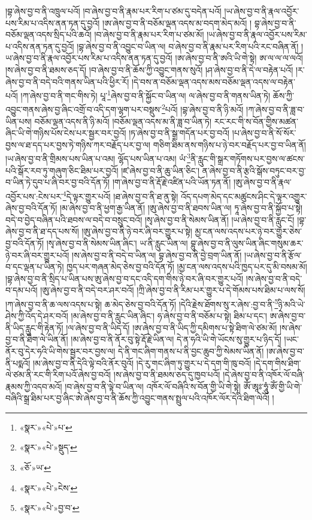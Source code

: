 །བྷ་ཞེས་བྱ་བ་ནི་འཁྲུལ་པའོ། །བ་ཞེས་བྱ་བ་ནི་རྣམ་པར་རིག་པ་ཙམ་དུ་བདེན་པའོ། །ཡ་ཞེས་བྱ་བ་ནི་རྣལ་འབྱོར་པས་རིམ་པ་འདིས་ནན་ཏན་དུ་བྱའོ། །ཨ་ཞེས་བྱ་བ་ནི་བཅོམ་ལྡན་འདས་མ་བདག་མེད་མའོ། །
བྷ་ཞེས་བྱ་བ་ནི་བཅོམ་ལྡན་འདས་སྲིད་པའི་ཆའོ། །བ་ཞེས་བྱ་བ་ནི་རྣམ་པར་རིག་པ་ཙམ་མོ། །ཡ་ཞེས་བྱ་བ་ནི་རྣལ་འབྱོར་པས་རིམ་པ་འདིས་ནན་ཏན་དུ་བྱའོ། །བྷ་ཞེས་བྱ་བ་ནི་འབྱུང་བ་ཡིན་ལ། བ་ཞེས་བྱ་བ་ནི་རྣམ་པར་རིག་པའི་རང་བཞིན་ནོ། །ཡ་ཞེས་བྱ་བ་ནི་རྣལ་འབྱོར་པས་རིམ་པ་འདིས་ནན་ཏན་དུ་བྱའོ། །ཨ་ཞེས་བྱ་བ་ནི་ཨའི་ཡི་གེ་སྟེ། ཨ་ལ་ལ་ལ་ལའོ། །ས་ཞེས་བྱ་བ་ནི་ཐམས་ཅད་དོ། །བ་ཞེས་བྱ་བ་ནི་ཆོས་ཀྱི་འབྱུང་གནས་སུའོ། །ཤ་ཞེས་བྱ་བ་ནི་དེ་ལ་བརྟེན་པའོ། །ར་ཞེས་བྱ་བ་ནི་བདེ་བའི་གནས་ཡིན་པའི་ཕྱིར་རོ། །དེ་བས་ན་བཅོམ་ལྡན་འདས་མས་བཅོམ་ལྡན་འདས་ལ་བརྟེན་པའོ། །ཀ་ཞེས་བྱ་བ་ནི་གང་གིས་ཏེ། པཱ་\footnote{«སྣར་»«པེ་»པ་}ཞེས་བྱ་བ་ནི་སྐྱོང་བ་ཡིན་ལ། ལ་ཞེས་བྱ་བ་ནི་གནས་ཡིན་ཏེ། ཆོས་ཀྱི་འབྱུང་གནས་ཞེས་བྱ་ཞིང་འགྲོ་བ་འདི་དག་ལྷག་པར་བསྡུས་\footnote{«སྣར་»«པེ་»སྡུད་}པའོ། །བྷ་ཞེས་བྱ་བ་ནི་ཉི་མའོ། །ཀ་ཞེས་བྱ་བ་ནི་ཟླ་བ་ཡིན་པས། བཅོམ་ལྡན་འདས་ནི་ཉི་མའོ། །བཅོམ་ལྡན་འདས་མ་ནི་ཟླ་བ་ཡིན་ཏེ། རང་རང་གི་ས་བོན་གྱིས་མཚན་ཞིང་ཡི་གེ་གཉིས་པོས་ངེས་པར་སྦྱར་བར་བྱའོ། །ཏ་ཞེས་བྱ་བ་ནི་སྒྲ་གདོན་པར་བྱ་བའོ། །པ་ཞེས་བྱ་བ་ནི་སོ་སོར་བྱས་ལ་ཐ་དད་པར་བྱས་ཏེ་གཉིས་ཀར་བརྗོད་པར་བྱ་ལ། གཅིག་ཐིམ་ནས་གཉིས་པ་ཉེ་བར་བརྗོད་པར་བྱ་བ་ཡིན་ནོ། །ཡ་ཞེས་བྱ་བ་ནི་གྲིམས་པས་ཡིན་པ་འམ། ལྷོད་པས་ཡིན་པ་འམ། ཡཾ་\footnote{«ཅོ་»ཡ་}ནི་རླུང་གི་སྒྲར་གཏོགས་པར་བྱས་ལ་ཚངས་པའི་སྒོར་རབ་ཏུ་གཞུག་ཅིང་ཐིམ་པར་བྱའོ། །ཛ་ཞེས་བྱ་བ་ནི་ཆུ་ཡིན་ཅིང་། ན་ཞེས་བྱ་བ་ནི་རྩའི་སྒོས་བཏུང་བར་བྱ་བ་ཡིན་ཏེ་དུབ་པ་ཞི་བར་བྱ་བའི་དོན་ཏོ། །ག་ཞེས་བྱ་བ་ནི་རྡོ་རྗེ་འཛིན་པའི་ཡོན་ཏན་ནོ། །ཨུ་ཞེས་བྱ་བ་ནི་རྣལ་འབྱོར་པས་:ངེས་པར་\footnote{«སྣར་»«པེ་»ངེས་}དེ་ལྟར་གྱུར་པའོ། །ཐ་ཞེས་བྱ་བ་ནི་ཐ་ནུ་སྟེ། འོད་དཔག་མེད་དང་མཚུངས་ཤིང་དེ་ལྟར་འགྱུར་ཞེས་བྱ་བའི་དོན་ཏོ། །མ་ཞེས་བྱ་བ་ནི་ཕྱག་རྒྱ་ཡིན་ནོ། །ཨུ་ཞེས་བྱ་བ་ནི་ཐབས་ཡིན་ལ། ཏཱ་ཞེས་བྱ་བ་ནི་སྐྱོབ་པ་སྟེ། བདེ་བ་བྱེད་བཞིན་པའི་ཐབས་ལ་བདེ་བ་བསྲུང་བའོ། །སྭ་ཞེས་བྱ་བ་ནི་སེམས་ཡིན་ནོ། །ཡ་ཞེས་བྱ་བ་ནི་རླུང་ངོ། །བྷ་ཞེས་བྱ་བ་ནི་ཐ་དད་པས་སོ། །ཨུ་ཞེས་བྱ་བ་ནི་ཉེ་བར་ཞི་བར་གྱུར་པ་སྟེ། མྱ་ངན་ལས་འདས་པར་ཉེ་བར་གྱུར་ཅེས་བྱ་བའི་དོན་ཏོ། །སྭ་ཞེས་བྱ་བ་ནི་སེམས་ཡིན་ཞིང་། ཡ་ནི་རླུང་ཡིན་ལ། བྷུ་ཞེས་བྱ་བ་ནི་ལུས་ཡིན་ཞིང་གསུམ་ཆར་ཉེ་བར་ཞི་བར་གྱུར་པའོ། །ས་ཞེས་བྱ་བ་ནི་བདེ་བ་ཡིན་ལ། བྷ་ཞེས་བྱ་བ་ནི་བྱེ་བྲག་ཡིན་ནོ། །ཡ་ཞེས་བྱ་བ་ནི་རྩོལ་བ་དང་ལྡན་པ་ཡིན་ཏེ། ཁྱད་པར་གཞན་མེད་ཅེས་བྱ་བའི་དོན་ཏོ། །མྱ་ངན་ལས་འདས་པའི་ཁྱད་པར་དུ་མི་བསམ་མོ། །བྷ་ཞེས་བྱ་བ་ནི་སྲིད་པ་ཡིན་པས་ཨུ་ཞེས་བྱ་བ་དང་འདི་དག་གིས་ཉེ་བར་ཞི་བར་གྱུར་པའོ། །ས་ཞེས་བྱ་བ་ནི་བདེ་བ་དམ་པའོ། །ཨུ་ཞེས་བྱ་བ་ནི་བདེ་བར་ཤར་བའོ། །ཀྲི་ཞེས་བྱ་བ་ནི་རིམ་པར་གྱུར་པ་དེ་གོམས་པས་ཐིམ་པ་ལས་སོ། །ཀ་ཞེས་བྱ་བ་ནི་ཆ་ལས་འདས་པ་སྟེ། ཆ་མེད་ཅེས་བྱ་བའི་དོན་ཏོ། །དེའི་རྗེས་ཐོགས་སུ་ར་ཞེས་:བྱ་བ་ནི་\footnote{«སྣར་»«པེ་»བྱ་བ་}ཉི་མའི་ཡེ་ཤེས་ཀྱི་འོད་དེ་ཤར་བའོ། །མ་ཞེས་བྱ་བ་ནི་རླུང་ཡིན་ཞིང་། ཧ་ཞེས་བྱ་བ་ནི་བཅོམ་པ་སྟེ། ཐིམ་པ་དང་། ཨ་ཞེས་བྱ་བ་ནི་ཡིད་རླུང་གི་རྟེན་ཏོ། །ལ་ཞེས་བྱ་བ་ནི་ཡིད་དོ། །ཨ་ཞེས་བྱ་བ་ནི་ཡིད་ཀྱི་དམིགས་པ་སྟེ་ཐིག་ལེ་ཙམ་མོ། །ས་ཞེས་བྱ་བ་ནི་ཐིག་ལེ་ཡིན་ནོ། །མ་ཞེས་བྱ་བ་ནི་ནོར་བུ་སྟེ་རྡོ་རྗེ་ཡིན་ལ། དེ་ན་ཧའི་ཡི་གེ་ཡོངས་སུ་གྱུར་པ་ཉིད་དོ། །ཡང་ནོར་བུ་དེར་ཧའི་ཡི་གེས་སྦྱར་བར་བྱས་ལ། དེ་ནི་གང་ཞིག་གནས་པ་ནི་བྱང་ཆུབ་ཀྱི་སེམས་ཡིན་ནོ། །ཨ་ཞེས་བྱ་བ་ནི་པདྨའོ། །མ་ཞེས་བྱ་བ་ནི་དེའི་ལྟེ་བའི་ནོར་བུའོ། །དེ་རུ་གང་ཞིག་ཏུ་གྱུར་པ་དེ་དག་གི་ཁུ་བའོ། །དེ་དག་གིས་ཐིག་ལེ་ཙམ་ནི་རང་གི་རིག་པའོ་ཞེས་བྱ་བའོ། །ས་ཞེས་བྱ་བ་ནི་ཐམས་ཅད་དུ་ཁྱབ་པའོ། །དེ་ཞེས་བྱ་བ་ནི་འཁོར་ལོ་བཞི་རྣམས་ཀྱི་འདབ་མའོ། །བ་ཞེས་བྱ་བ་ནི་ལྟེ་བ་ཡིན་ལ། འཁོར་ལོ་བཞིའི་ས་བོན་གྱི་ཡི་གེ་སྟེ། ཨོཾ་ཨཱཿ་ཧཱུཾ་ཨོཾ་གྱི་ཡི་གེ་བཞིའི་སྒྲ་ཐིམ་པར་བྱ་ཞིང་ཨེ་ཞེས་བྱ་བ་ནི་ཆོས་ཀྱི་འབྱུང་གནས་སྤྲུལ་པའི་འཁོར་ལོར་དེའི་ཐིག་ལེའོ། །
